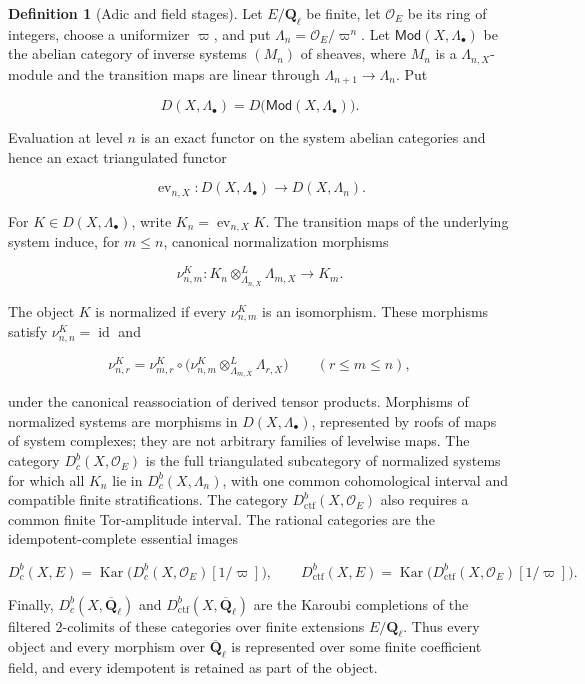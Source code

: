 \documentclass[10pt]{article}
\theoremstyle{definition}
\newtheorem{definition}[theorem]{Definition}
\newcommand{\Ql}{\mathbf Q_\ell}
\newcommand{\Qlb}{\overline{\mathbf Q}_\ell}
\newcommand{\OO}{\mathcal O}
\newcommand{\Dbc}{D^b_c}
\newcommand{\Dctf}{D^b_{\mathrm{ctf}}}
\begin{document}
\begin{definition}[Adic and field stages]
Let \(E/\Ql\) be finite, let \(\OO_E\) be its ring of integers, choose a
uniformizer \(\varpi\), and put \(\Lambda_n=\OO_E/\varpi^n\).
Let \(\mathsf{Mod}(X,\Lambda_\bullet)\) be the abelian category of inverse
systems \((M_n)\) of sheaves, where \(M_n\) is a
\(\Lambda_{n,X}\)-module and the transition maps are linear through
\(\Lambda_{n+1}\to\Lambda_n\).  Put

\[
 D(X,\Lambda_\bullet)=D\bigl(\mathsf{Mod}(X,\Lambda_\bullet)\bigr).
\]

Evaluation at level \(n\) is an exact functor on the system abelian
categories and hence an exact triangulated functor

\[
 \operatorname{ev}_{n,X}:D(X,\Lambda_\bullet)\longrightarrow
 D(X,\Lambda_n).
\]

For \(K\in D(X,\Lambda_\bullet)\), write
\(K_n=\operatorname{ev}_{n,X}K\).  The transition maps of the underlying
system induce, for \(m\leq n\), canonical normalization morphisms

\[
 \nu^K_{n,m}:
 K_n\otimes^L_{\Lambda_{n,X}}\Lambda_{m,X}\longrightarrow K_m.
\]

The object \(K\) is normalized if every \(\nu^K_{n,m}\) is an isomorphism.
These morphisms satisfy \(\nu^K_{n,n}=\operatorname{id}\) and

\[
 \nu^K_{n,r}=\nu^K_{m,r}\circ
 \bigl(\nu^K_{n,m}\otimes^L_{\Lambda_{m,X}}\Lambda_{r,X}\bigr)
 \qquad(r\leq m\leq n),
\]

under the canonical reassociation of derived tensor products.  Morphisms of
normalized systems are morphisms in \(D(X,\Lambda_\bullet)\), represented by
roofs of maps of system complexes; they are not arbitrary families of
levelwise maps.  The category
\(\Dbc(X,\OO_E)\) is the full triangulated subcategory of normalized systems
for which all
\(K_n\) lie in \(\Dbc(X,\Lambda_n)\), with one common cohomological interval
and compatible finite stratifications.  The category
\(\Dctf(X,\OO_E)\) also requires a common finite Tor-amplitude interval.
The rational categories are the idempotent-complete essential images

\[
 \Dbc(X,E)=\operatorname{Kar}\bigl(\Dbc(X,\OO_E)[1/\varpi]\bigr),
 \qquad
 \Dctf(X,E)=\operatorname{Kar}\bigl(\Dctf(X,\OO_E)[1/\varpi]\bigr).
\]

Finally, \(\Dbc(X,\Qlb)\) and \(\Dctf(X,\Qlb)\) are the Karoubi completions of
the filtered \(2\)-colimits of these categories over finite extensions
\(E/\Ql\).  Thus every object and every morphism over \(\Qlb\) is represented
over some finite coefficient field, and every idempotent is retained as part
of the object.
\end{definition}
\end{document}
